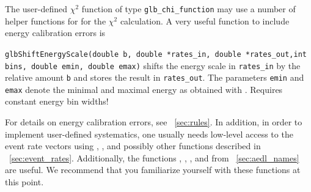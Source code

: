 The user-defined $\chi^2$ function of type {\tt glb\_chi\_function} may use a number of helper functions for
for the $\chi^2$ calculation. 
A very useful function to include energy calibration errors is
\begin{function}
{\tt glbShiftEnergyScale(double b, double *rates\_in, double *rates\_out,int bins, double emin, double emax)}
shifts the energy scale in {\tt rates\_in} by the relative amount {\tt b} and stores the result in 
{\tt rates\_out}. The parameters {\tt emin} and {\tt emax} denote the minimal and maximal energy
as obtained with . Requires constant energy bin widths!
\end{function}
For details on energy calibration errors, see \Sec~\ref{sec:rules}.
%
In addition, in order to implement user-defined systematics, one usually needs low-level access to the event rate vectors using , ,  and possibly other functions described in \Sec~\ref{sec:event_rates}. Additionally, the
functions , , , and  from \Sec~\ref{sec:aedl_names} are useful.  We recommend that you familiarize yourself with these functions at this point.

